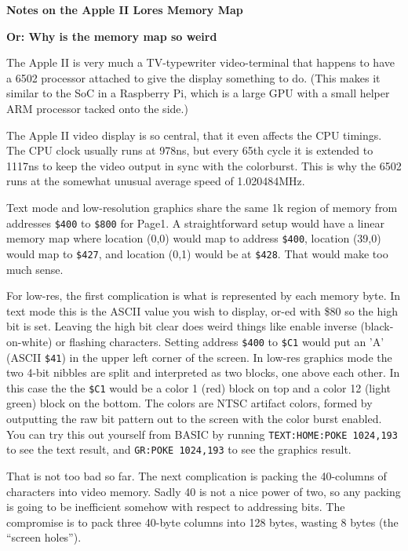 \documentclass{article}
\begin{document}
\begin{center}
\begin{large}
{\bf Notes on the Apple II Lores Memory Map}
\end{large}

{\bf Or: Why is the memory map so weird}
\end{center}
The Apple II is very much
a TV-typewriter video-terminal that happens to have a 6502
processor attached to give the display something to do.
(This makes it similar to the SoC in a Raspberry Pi, which is
a large GPU with a small helper ARM processor tacked onto the side.)

The Apple II video display is so central, that it even affects the
CPU timings.
The CPU clock usually runs at 978ns, but every 65th cycle
it is extended to 1117ns to keep the video output in sync with the colorburst.
This is why the 6502 runs at the somewhat unusual average speed of 1.020484MHz.

Text mode and low-resolution graphics share the same 1k region of memory
from addresses {\tt \$400} to {\tt \$800} for Page1.
A straightforward setup would have a linear memory map where
location (0,0) would map to address {\tt \$400}, location (39,0) would map
to {\tt \$427}, and location (0,1) would be at {\tt \$428}.
That would make too much sense.

For low-res, the first complication is what is represented by each 
memory byte.
In text mode this is the ASCII value you wish to display, or-ed with
\$80 so the high bit is set.
Leaving the high bit clear does weird things like enable inverse 
(black-on-white) or flashing characters.
Setting address {\tt \$400} to {\tt \$C1}
would put an 'A' (ASCII {\tt \$41})
in the upper left corner of the screen.
In low-res graphics mode the two 4-bit nibbles are split and
interpreted as two blocks, one above each other.
In this case the the {\tt \$C1} would be a color 1 (red) block on top
and a color 12 (light green) block on the bottom.
The colors are NTSC artifact colors, formed by outputting the raw bit
pattern out to the screen with the color burst enabled.
You can try this out yourself from BASIC by running 
{\tt TEXT:HOME:POKE 1024,193} to see the text result, and
{\tt GR:POKE 1024,193} to see the graphics result.

That is not too bad so far.
The next complication is packing the 40-columns of characters into
video memory.
Sadly 40 is not a nice power of two, so any packing is going to 
be inefficient somehow with respect to addressing bits.
The compromise is to pack three 40-byte columns into 128 bytes,
wasting 8 bytes (the ``screen holes'').
\end{document}
